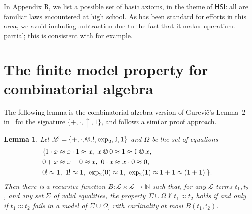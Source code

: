 \documentclass[eqnor,reqno]{amsart}
\theoremstyle{plain}
\newtheorem{lem}[thm]{Lemma}
\theoremstyle{definition}
\newcommand{\cc}{\mathbin{\textup{\copyright}}}
\newcommand{\HSI}{\textsf{HSI}}
\begin{document}
In Appendix B, we list a possible set of basic axioms, in the theme of $\HSI$: all are familiar laws encountered at high school.    As has been standard for efforts in this area, we avoid including subtraction due to the fact that it makes operations partial; this is consistent with \cite{burlee92,mcnsha} for example.



\section{The finite model property for combinatorial algebra}
The following lemma is the combinatorial algebra version of Gurevi\v{c}'s Lemma~2 in~\cite{gur85} for the signature $\{+,\cdot,\uparrow,1\}$, and follows a similar proof approach. 
\begin{lem}\label{lem:gurevic}
Let $\mathscr{L}= \{+,\cdot,\cc,!,\exp_2,0,1\}$ and $\Omega$ be the set of equations 
\begin{align*}
&\{1\cdot x\approx x\cdot 1\approx x,\  x\cc 0\approx 1\approx 0\cc x,\\
& 0+x\approx x+0\approx x,\ 0\cdot x\approx x\cdot 0\approx 0,\\
&0!\approx 1,\ 1!\approx 1,\ \exp_2(0)\approx 1,\ \exp_2(1)\approx 1+1\approx (1+1)!\}.
\end{align*}
Then there is a recursive function $B:\mathscr{L} \times \mathscr{L} \rightarrow \mathbb{N} $ such that, for any $\mathscr{L}$-terms $t_1, t_2$, and any set 
$\Sigma$ of valid equalities, the property
$\Sigma\cup\Omega\nvdash t_1\approx t_2$ holds
 if and only if $t_1\approx t_2$ fails in a model of $\Sigma\cup\Omega$, with cardinality at most $B(t_1,t_2)$.
\end{lem}
\end{document}
